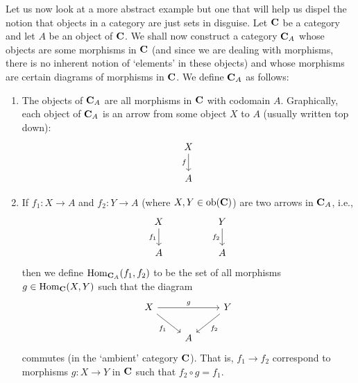 \begin{example}
    \label{ex:slice-category}
    Let us now look at a more abstract example but one that will help us dispel
    the notion that objects in a category are just sets in disguise. Let
    \(\mathbf{C}\) be a category and let \(A\) be an object of \(\mathbf{C}\). We
    shall now construct a category \(\mathbf{C}_A\) whose objects are some
    morphisms in \(\mathbf{C}\) (and since we are dealing with morphisms, there is
    no inherent notion of `elements' in these objects) and whose morphisms are
    certain diagrams of morphisms in \(\mathbf{C}\). We define \(\mathbf{C}_A\) as
    follows:
    \begin{enumerate}[label=(\alph*), itemsep=0pt, wide]
        \item The objects of \(\mathbf{C}_A\) are all morphisms in \(\mathbf{C}\)
        with codomain \(A\). Graphically, each object of \(\mathbf{C}_A\) is an
        arrow from some object \(X\) to \(A\) (usually written top down):
        \[
            \begin{tikzcd}
                X \arrow[d, "f"'] \\
                A                
            \end{tikzcd}
        \]
        \item If \(f_1 : X \to A\) and \(f_2 : Y \to A\) (where \(X, Y \in
        \operatorname{ob}(\mathbf{\mathbf{C}})\)) are two arrows in \(\mathbf{C}_A\), i.e.,
        \[
            \begin{tikzcd}
                X \arrow[d, "f_1"'] &  & Y \arrow[d, "f_2"'] \\
                A                   &  & A                  
            \end{tikzcd}
        \]
        then we define \(\operatorname{Hom}_{\mathbf{C}_A}(f_1, f_2)\) to be the set of all
        morphisms \(g \in \operatorname{Hom}_{\mathbf{C}}(X, Y)\) such that the diagram
        \[
            \begin{tikzcd}
                X \arrow[rr, "g"] \arrow[rd, "f_1"'] &   & Y \arrow[ld, "f_2"] \\
                                                                    & A &                    
                \end{tikzcd}
        \]
        commutes (in the `ambient' category \(\mathbf{C}\)). That is, \(f_1 \to
        f_2\) correspond to morphisms \(g : X \to Y\) in \(\mathbf{C}\) such that
        \(f_2 \circ g = f_1\).
    \end{enumerate}
    

\end{example}
